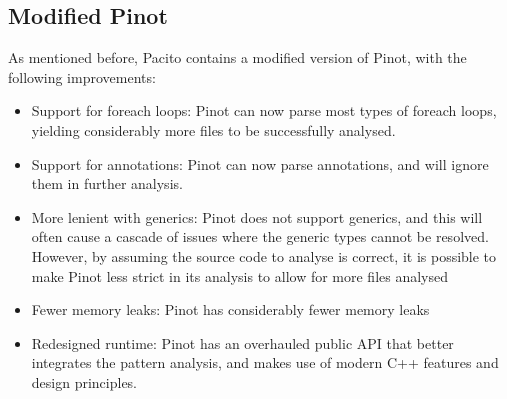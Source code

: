 \subsection{Modified Pinot}
As mentioned before, Pacito contains a modified version of Pinot, with the following improvements:
\begin{itemize}
    \item Support for foreach loops: Pinot can now parse most types of foreach loops, yielding considerably more files to be successfully analysed.
    \item Support for annotations: Pinot can now parse annotations, and will ignore them in further analysis.
    \item More lenient with generics: Pinot does not support generics, and this will often cause a cascade of issues where the generic types cannot be resolved. However, by assuming the source code to analyse is correct, it is possible to make Pinot less strict in its analysis to allow for more files analysed
    \item Fewer memory leaks: Pinot has considerably fewer memory leaks
    \item Redesigned runtime: Pinot has an overhauled public API that better integrates the pattern analysis, and makes use of modern C++ features and design principles.
\end{itemize}

